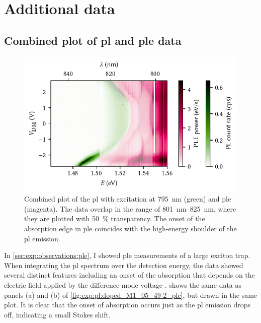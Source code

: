 \section{Additional data}\label{sec:app:exp:observations}
\subsection{Combined plot of \texorpdfstring{\acrshort{pl}}{PL} and \texorpdfstring{\acrshort{ple}}{PLE} data}\label{subsec:app:exp:observations:meas:pl_ple}
\begin{figure}
    \centering
    \includegraphics{img/pdf/experiment/doped_M1_05_49-2_ple_single}
    \caption[
        \protect\newline
    ]{
        Combined plot of the \gls{pl} with excitation at \qty{795}{\nano\meter} (green) and \gls{ple} (magenta).
        The data overlap in the range of \qtyrange{801}{825}{\nano\meter}, where they are plotted with \qty{50}{\percent} transparency.
        The onset of the absorption edge in \gls{ple} coincides with the high-energy shoulder of the \gls{pl} emission.
    }
    \label{fig:app:exp:pl:doped_M1_05_49-2_ple}
\end{figure}

In \cref{sec:exp:observations:ple}, I showed \gls{ple} measurements of a large exciton trap.
When integrating the \gls{pl} spectrum over the detection energy, the data showed several distinct features including an onset of the absorption that depends on the electric field applied by the difference-mode voltage \VDM.
 shows the same data as panels (a) and (b) of \cref{fig:exp:pl:doped_M1_05_49-2_ple}, but drawn in the same plot.
It is clear that the onset of absorption occurs just as the \gls{pl} emission drops off, indicating a small Stokes shift.

